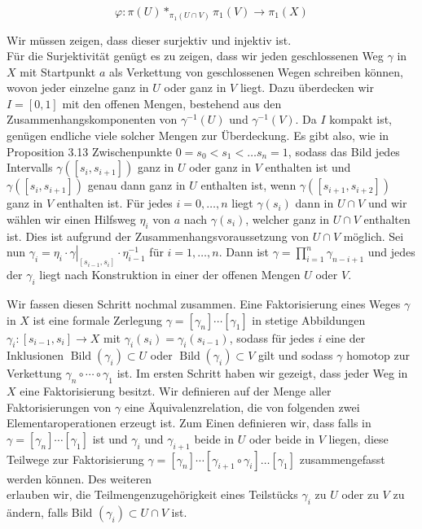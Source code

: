 \documentclass[10pt, letterpaper]{article}
\begin{document}
$$
\varphi: \pi(U) *_{\pi_{1}(U \cap V)} \pi_{1}(V) \rightarrow \pi_{1}(X)
$$

Wir müssen zeigen, dass dieser surjektiv und injektiv ist.\\
Für die Surjektivität genügt es zu zeigen, dass wir jeden geschlossenen Weg $\gamma$ in $X$ mit Startpunkt $a$ als Verkettung von geschlossenen Wegen schreiben können, wovon jeder einzelne ganz in $U$ oder ganz in $V$ liegt. Dazu überdecken wir $I=[0,1]$ mit den offenen Mengen, bestehend aus den Zusammenhangskomponenten von $\gamma^{-1}(U)$ und $\gamma^{-1}(V)$. Da $I$ kompakt ist, genügen endliche viele solcher Mengen zur Überdeckung. Es gibt also, wie in Proposition 3.13 Zwischenpunkte $0=s_{0}<s_{1}<\ldots s_{n}=1$, sodass das Bild jedes Intervalls $\gamma\left(\left[s_{i}, s_{i+1}\right]\right)$ ganz in $U$ oder ganz in $V$ enthalten ist und $\gamma\left(\left[s_{i}, s_{i+1}\right]\right)$ genau dann ganz in $U$ enthalten ist, wenn $\gamma\left(\left[s_{i+1}, s_{i+2}\right]\right)$ ganz in $V$ enthalten ist. Für jedes $i=0, \ldots, n$ liegt $\gamma\left(s_{i}\right)$ dann in $U \cap V$ und wir wählen wir einen Hilfsweg $\eta_{i}$ von $a$ nach $\gamma\left(s_{i}\right)$, welcher ganz in $U \cap V$ enthalten ist. Dies ist aufgrund der Zusammenhangsvoraussetzung von $U \cap V$ möglich. Sei nun $\gamma_{i}=\left.\eta_{i} \cdot \gamma\right|_{\left[s_{i-1}, s_{i}\right]} \cdot \eta_{i-1}^{-1}$ für $i=1, \ldots, n$. Dann ist $\gamma=\prod_{i=1}^{n} \gamma_{n-i+1}$ und jedes der $\gamma_{i}$ liegt nach Konstruktion in einer der offenen Mengen $U$ oder $V$.

Wir fassen diesen Schritt nochmal zusammen. Eine Faktorisierung eines Weges $\gamma$ in $X$ ist eine formale Zerlegung $\gamma=\left[\gamma_{n}\right] \cdots\left[\gamma_{1}\right]$ in stetige Abbildungen $\gamma_{i}:\left[s_{i-1}, s_{i}\right] \rightarrow X$ mit $\gamma_{i}\left(s_{i}\right)=\gamma_{i}\left(s_{i-1}\right)$, sodass für jedes $i$ eine der Inklusionen $\operatorname{Bild}\left(\gamma_{i}\right) \subset U$ oder $\operatorname{Bild}\left(\gamma_{i}\right) \subset V$ gilt und sodass $\gamma$ homotop zur Verkettung $\gamma_{n} \circ \cdots \circ \gamma_{1}$ ist. Im ersten Schritt haben wir gezeigt, dass jeder Weg in $X$ eine Faktorisierung besitzt. Wir definieren auf der Menge aller Faktorisierungen von $\gamma$ eine Äquivalenzrelation, die von folgenden zwei Elementaroperationen erzeugt ist. Zum Einen definieren wir, dass falls in $\gamma=\left[\gamma_{n}\right] \cdots\left[\gamma_{1}\right]$ ist und $\gamma_{i}$ und $\gamma_{i+1}$ beide in $U$ oder beide in $V$ liegen, diese Teilwege zur Faktorisierung $\gamma=\left[\gamma_{n}\right] \cdots\left[\gamma_{i+1} \circ \gamma_{i}\right] \ldots\left[\gamma_{1}\right]$ zusammengefasst werden können. Des weiteren\\
erlauben wir, die Teilmengenzugehörigkeit eines Teilstücks $\gamma_{i}$ zu $U$ oder zu $V$ zu ändern, falls Bild $\left(\gamma_{i}\right) \subset U \cap V$ ist.
\end{document}
